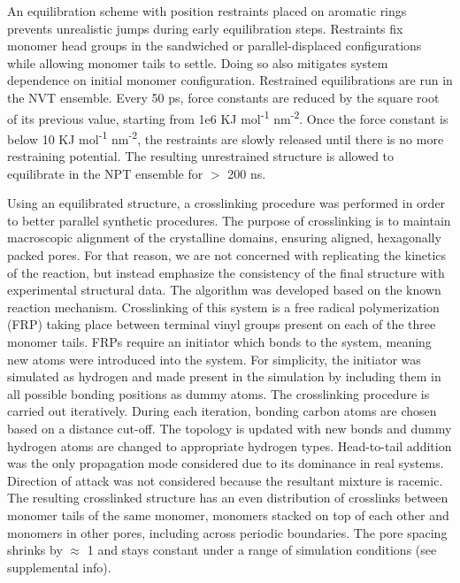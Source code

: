 An equilibration scheme with position restraints placed on aromatic rings
prevents unrealistic jumps during early equilibration steps. Restraints
fix monomer head groups in the sandwiched or parallel-displaced 
configurations while allowing monomer tails to settle. Doing so also mitigates 
system dependence on initial monomer configuration. Restrained
equilibrations are run in the NVT ensemble. Every 50 ps, force constants 
are reduced by the square root of its previous value, starting from 
1e6 KJ mol\textsuperscript{-1} nm\textsuperscript{-2}. Once the force constant
is below 10 KJ mol\textsuperscript{-1} nm\textsuperscript{-2}, the 
restraints are slowly released until there is no more restraining 
potential. The resulting unrestrained structure is allowed to 
equilibrate in the NPT ensemble for $>$ 200 ns.  %


Using an equilibrated structure, a crosslinking procedure was performed
in order to better parallel synthetic procedures. The purpose of 
crosslinking is to maintain macroscopic alignment of the crystalline
domains, ensuring aligned, hexagonally packed pores. For that reason, we
are not concerned with replicating the kinetics of the reaction, but
instead emphasize the consistency of the final structure with experimental
structural data. The algorithm was developed based on the known reaction
mechanism. Crosslinking of this system is a free radical polymerization (FRP)
taking place between terminal vinyl groups present on each of the three
monomer tails. FRPs require an initiator which bonds to the system, 
meaning new atoms were introduced into the system. For simplicity, the 
initiator was simulated as hydrogen and made present in the simulation
by including them in all possible bonding positions as dummy atoms.
The crosslinking procedure is carried out iteratively. During each 
iteration, bonding carbon atoms are chosen based on a distance cut-off.
The topology is updated with new bonds and dummy hydrogen atoms are 
changed to appropriate hydrogen types. Head-to-tail addition was the
only propagation mode considered due to its dominance in real systems.
Direction of attack was not considered because the resultant mixture is
racemic. The resulting crosslinked structure has an even distribution of
crosslinks between monomer tails of the same monomer, monomers stacked on
top of each other and monomers in other pores, including across periodic
boundaries. The pore spacing shrinks by $\approx$ 1 \angstrom and stays 
constant under a range of simulation conditions (see supplemental info). 

